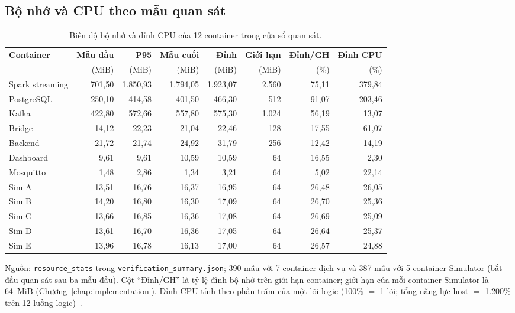 \subsection{Bộ nhớ và CPU theo mẫu quan sát}
\begin{table}[H]
\centering
\caption{Biên độ bộ nhớ và đỉnh CPU của 12 container trong cửa sổ quan sát.}
\label{tab:memory-results}
\footnotesize
\setlength{\tabcolsep}{3pt}
\begin{tabular}{l r r r r r r r}
\toprule
\textbf{Container} & \textbf{Mẫu đầu} & \textbf{P95} & \textbf{Mẫu cuối} & \textbf{Đỉnh} & \textbf{Giới hạn} & \textbf{Đỉnh/GH} & \textbf{Đỉnh CPU} \\
 & (MiB) & (MiB) & (MiB) & (MiB) & (MiB) & (\%) & (\%) \\
\midrule
Spark streaming & 701,50 & 1.850,93 & 1.794,05 & 1.923,07 & 2.560 & 75,11 & 379,84 \\
PostgreSQL & 250,10 & 414,58 & 401,50 & 466,30 & 512 & 91,07 & 203,46 \\
Kafka & 422,80 & 572,66 & 557,80 & 575,30 & 1.024 & 56,19 & 13,07 \\
Bridge & 14,12 & 22,23 & 21,04 & 22,46 & 128 & 17,55 & 61,07 \\
Backend & 21,72 & 21,74 & 24,92 & 31,79 & 256 & 12,42 & 14,19 \\
Dashboard & 9,61 & 9,61 & 10,59 & 10,59 & 64 & 16,55 & 2,30 \\
Mosquitto & 1,48 & 2,86 & 1,34 & 3,21 & 64 & 5,02 & 22,14 \\
\midrule
Sim A & 13,51 & 16,76 & 16,37 & 16,95 & 64 & 26,48 & 26,05 \\
Sim B & 14,20 & 16,80 & 16,30 & 17,09 & 64 & 26,70 & 25,36 \\
Sim C & 13,66 & 16,85 & 16,36 & 17,08 & 64 & 26,69 & 25,09 \\
Sim D & 13,61 & 16,70 & 16,36 & 17,05 & 64 & 26,64 & 25,37 \\
Sim E & 13,96 & 16,78 & 16,13 & 17,00 & 64 & 26,57 & 24,88 \\
\bottomrule
\end{tabular}
\end{table}
{\footnotesize\noindent Nguồn: \texttt{resource\_stats} trong \texttt{verification\_summary.json}; 390 mẫu với 7 container dịch vụ và 387 mẫu với 5 container Simulator (bắt đầu quan sát sau ba mẫu đầu). Cột ``Đỉnh/GH'' là tỷ lệ đỉnh bộ nhớ trên giới hạn container; giới hạn của mỗi container Simulator là 64~MiB (Chương~\ref{chap:implementation}). Đỉnh CPU tính theo phần trăm của một lõi logic (100\% $=$ 1 lõi; tổng năng lực host $=$ 1.200\% trên 12 luồng logic)~\cite{bigdata_run_archive}.\par}

